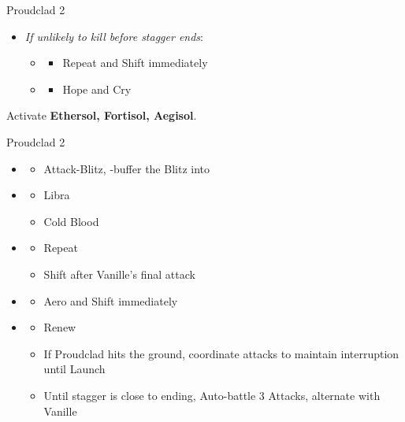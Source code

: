 \begin{paracol}{2}
\begin{battle}{Proudclad 2}
\begin{itemize}
		\item \textit{If unlikely to kill before stagger ends}:
		      \begin{itemize}
			      \item \first
			            \begin{itemize}
				            \item Repeat and Shift immediately
			            \end{itemize}
			      \item \second
			            \begin{itemize}
				            \item Hope and Cry
			            \end{itemize}
		      \end{itemize}
	\end{itemize}
\end{battle}
\switchcolumn
Activate \textbf{Ethersol, Fortisol, Aegisol}.
\begin{battle}{Proudclad 2}
	\begin{itemize}
		\item \second
		      \begin{itemize}
			      \item Attack-Blitz, \rav-buffer the Blitz into
		      \end{itemize}
		\item \sixth
		      \begin{itemize}
			      \item Libra
			      \item Cold Blood
		      \end{itemize}
		\item \fifth
		      \begin{itemize}
			      \item Repeat
			      \item Shift after Vanille's final attack
		      \end{itemize}
		\item \first
		      \begin{itemize}
			      \item Aero and Shift immediately
		      \end{itemize}
		\item \second
		      \begin{itemize}
			      \item Renew
			      \item If Proudclad hits the ground, coordinate attacks to maintain interruption until Launch
			      \item Until stagger is close to ending, Auto-battle 3 Attacks, alternate with Vanille

\end{itemize}
\end{itemize}
\end{battle}
\end{paracol}
